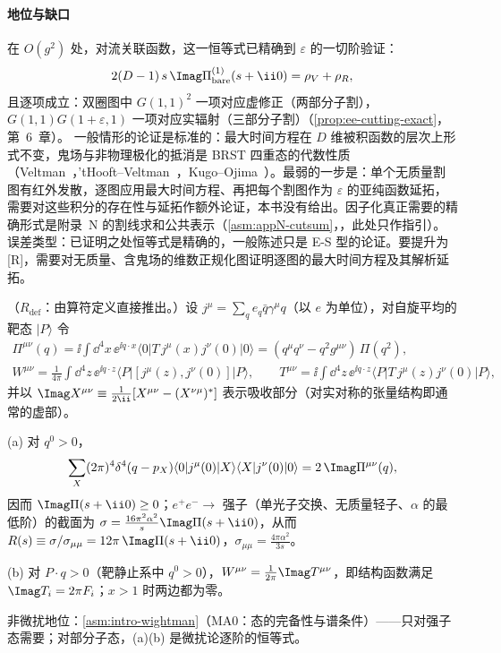 \paragraph{地位与缺口}
在 $O(g^2)$ 处，对流关联函数，这一恒等式已精确到 $\varepsilon$ 的一切阶验证：
\[
2(D-1)\,s\,\Imag\Pi^{(1)}_{\mathrm{bare}}(s+\ii0)=\rho_V+\rho_R , %
\]
且逐项成立：双圈图中 $G(1,1)^2$ 一项对应虚修正（两部分子割），$G(1,1)G(1+\varepsilon,1)$ 一项对应实辐射（三部分子割）（\cref{prop:ee-cutting-exact}，第~6~章）。
一般情形的论证是标准的：最大时间方程在 $D$ 维被积函数的层次上形式不变，鬼场与非物理极化的抵消是 BRST 四重态的代数性质（Veltman~\cite{Veltman1963}，'tHooft--Veltman~\cite{tHooftVeltman1972b,tHooftVeltman1974}，Kugo--Ojima~\cite{KugoOjima1979}）。最弱的一步是：单个无质量割图有红外发散，逐图应用最大时间方程、再把每个割图作为 $\varepsilon$ 的亚纯函数延拓，需要对这些积分的存在性与延拓作额外论证，本书没有给出。因子化真正需要的精确形式是附录~N 的割线求和公共表示（\cref{asm:appN-cutsum}，\tagA，此处只作指引）。误差类型：已证明之处恒等式是精确的，一般陈述只是 E-S 型的论证。要提升为 [R]，需要对无质量、含鬼场的维数正规化图证明逐图的最大时间方程及其解析延拓。

\begin{proposition}\label{prop:prelim-optical}
（$R_{\mathrm{def}}$：由算符定义直接推出。）设 $j^\mu=\sum_qe_q\bar q\gamma^\mu q$（以 $e$ 为单位），对自旋平均的靶态 $|P\rangle$ 令 %
\begin{gather*}
\Pi^{\mu\nu}(q)=\ii\int\dd^4x\,\ee^{\ii q\cdot x}\langle0|T\,j^\mu(x)j^\nu(0)|0\rangle=(q^\mu q^\nu-q^2g^{\mu\nu})\,\Pi(q^2),\\
W^{\mu\nu}=\frac1{4\pi}\int\dd^4z\,\ee^{\ii q\cdot z}\langle P|[j^\mu(z),j^\nu(0)]|P\rangle,\qquad
T^{\mu\nu}=\ii\int\dd^4z\,\ee^{\ii q\cdot z}\langle P|T\,j^\mu(z)j^\nu(0)|P\rangle ,
\end{gather*}
并以 $\Imag X^{\mu\nu}\equiv\frac1{2\ii}[X^{\mu\nu}-(X^{\nu\mu})^*]$ 表示吸收部分（对实对称的张量结构即通常的虚部）。
\par
(a) 对 $q^0>0$，
\begin{equation}\label{eq:prelim-optical-vac}
\sum_X(2\pi)^4\delta^4(q-p_X)\langle0|j^\mu(0)|X\rangle\langle X|j^\nu(0)|0\rangle=2\,\Imag\Pi^{\mu\nu}(q),
\end{equation}
因而 $\Imag\Pi(s+\ii0)\ge0$；$e^+e^-\to$ 强子（单光子交换、无质量轻子、$\alpha$ 的最低阶）的截面为 $\sigma=\frac{16\pi^2\alpha^2}{s}\Imag\Pi(s+\ii0)$，从而 $R(s)\equiv\sigma/\sigma_{\mu\mu}=12\pi\,\Imag\Pi(s+\ii0)$，$\sigma_{\mu\mu}=\frac{4\pi\alpha^2}{3s}$。
\par
(b) 对 $P\cdot q>0$（靶静止系中 $q^0>0$），$W^{\mu\nu}=\frac1{2\pi}\Imag T^{\mu\nu}$，即结构函数满足 $\Imag T_i=2\pi F_i$；$x>1$ 时两边都为零。
\par
非微扰地位：\cref{asm:intro-wightman}（MA0：态的完备性与谱条件）——只对强子态需要；对部分子态，(a)(b) 是微扰论逐阶的恒等式。
\end{proposition}

